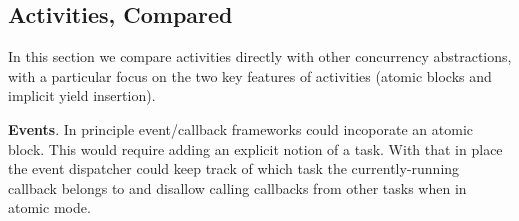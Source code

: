 \documentclass[9pt,preprint]{sigplanconf}
\begin{document}




\subsection{Activities, Compared}

In this section we compare activities directly with other concurrency abstractions, with a particular focus on the two key features of activities (atomic blocks and implicit yield insertion).

\textbf{Events}.
In principle event/callback frameworks could incoporate an atomic block.
This would require adding an explicit notion of a task.
With that in place the event dispatcher could keep track of which task the currently-running callback belongs to and disallow calling callbacks from other tasks when in atomic mode.
\end{document}
